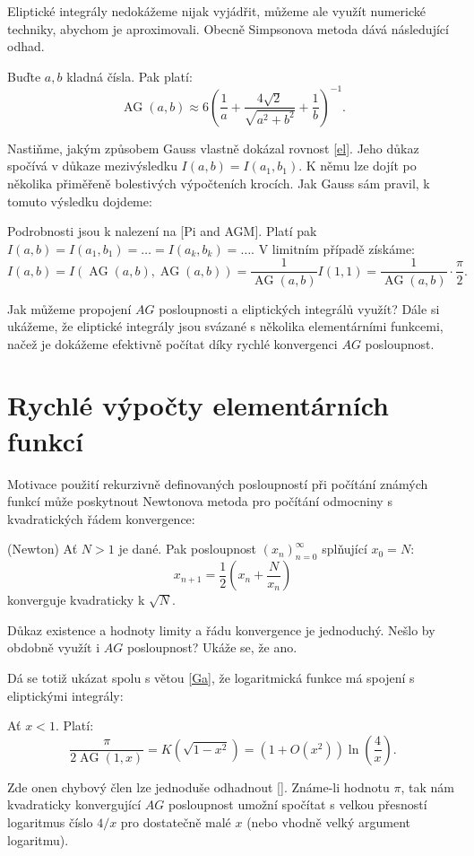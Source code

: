 \documentclass[12pt]{report}
\DeclareMathOperator{\AG}{AG}
\begin{document}
Eliptické integrály nedokážeme nijak  vyjádřit, můžeme ale využít numerické techniky, abychom je aproximovali. Obecně Simpsonova metoda dává následující odhad.
\begin{veta}
Buďte $a,b$ kladná čísla. Pak platí:
$$\AG(a,b) \approx 6 \left(\frac{1}{a} + \frac{4\sqrt{2}}{\sqrt{a^2+b^2}} + \frac{1}{b} \right)^{-1}.$$
\end{veta}


Nastiňme, jakým způsobem Gauss vlastně dokázal rovnost \eqref{el}. Jeho důkaz spočívá v důkaze mezivýsledku $I(a,b) = I(a_1,b_1)$. K němu lze dojít po několika přiměřeně bolestivých výpočteních krocích. Jak Gauss sám pravil, k tomuto výsledku dojdeme:

\begin{center}
\begin{verse}
\textit{}
\end{verse}
\end{center}
Podrobnosti jsou k nalezení na [Pi and AGM]. Platí pak $I(a,b) = I(a_1,b_1) = \dots = I(a_k,b_k) = \dots$. V limitním případě získáme: $$I(a,b) = I(\AG(a,b),\AG(a,b)) = \frac{1}{\AG(a,b)} I(1,1) = \frac{1}{\AG(a,b)} \cdot \frac{\pi}{2}.$$ 

Jak můžeme propojení $AG$ posloupnosti a eliptických integrálů využít? Dále si ukážeme, že eliptické integrály jsou svázané s několika elementárními funkcemi, načež je dokážeme efektivně počítat díky rychlé konvergenci $AG$ posloupnost.

\section{Rychlé výpočty elementárních funkcí}

Motivace použití rekurzivně definovaných posloupností při počítání známých funkcí může poskytnout Newtonova metoda pro počítání odmocniny s kvadratických řádem konvergence:

\begin{veta}(Newton)
Ať $N>1$ je dané. Pak posloupnost $(x_n)_{n=0}^{\infty}$ splňující $x_0 = N$:
$$x_{n+1} = \frac{1}{2} \left( x_n + \frac{N}{x_n}\right)$$
konverguje kvadraticky k $\sqrt{N}$.
\end{veta}
Důkaz existence a hodnoty limity a řádu konvergence je jednoduchý. Nešlo by obdobně využít i $AG$ posloupnost? Ukáže se, že ano.

Dá se totiž ukázat spolu s větou \ref{Ga}, že logaritmická funkce má spojení s eliptickými integrály:
\begin{veta}
Ať $x < 1$. Platí:
$$ \frac{\pi}{2 \AG(1,x)} =K(\sqrt{1-x^2}) = \left(1+O(x^2)\right)\ln\left(\frac{4}{x} \right).$$
\end{veta}
Zde onen chybový člen lze jednoduše odhadnout []. Známe-li hodnotu $\pi$, tak nám kvadraticky konvergující $AG$ posloupnost umožní spočítat s velkou přesností logaritmus číslo $4/x$ pro dostatečně malé $x$ (nebo vhodně velký argument logaritmu).
\end{document}
